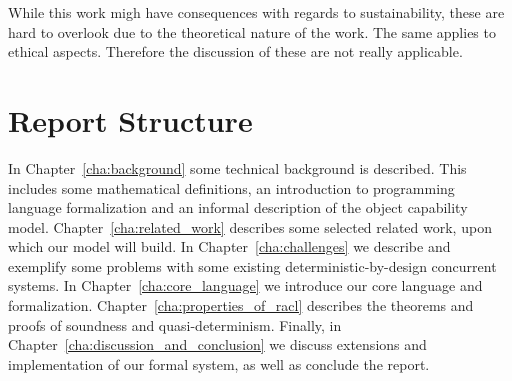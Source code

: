 While this work migh have consequences with regards to sustainability, these are
hard to overlook due to the theoretical nature of the work. The same applies to
ethical aspects. Therefore the discussion of these are not really applicable.

\section{Report Structure}%
\label{sec:report_structure}

In Chapter~\ref{cha:background} some technical background is described. This
includes some mathematical definitions, an introduction to programming language
formalization and an informal description of the object capability
model. Chapter~\ref{cha:related_work} describes some selected related work, upon
which our model will build. In Chapter~\ref{cha:challenges} we describe and
exemplify some problems with some existing deterministic-by-design concurrent
systems. In Chapter~\ref{cha:core_language} we introduce our core language and
formalization. Chapter~\ref{cha:properties_of_racl} describes the theorems and
proofs of soundness and quasi-determinism. Finally, in
Chapter~\ref{cha:discussion_and_conclusion} we discuss extensions and
implementation of our formal system, as well as conclude the report.




